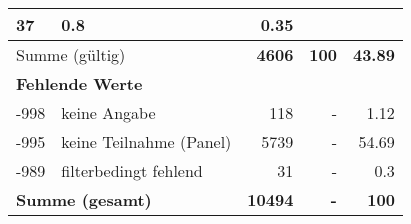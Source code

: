 \begin{longtable}{lXrrr}
       \num{37} &
       \num[round-mode=places,round-precision=2]{0,8} &
         \num[round-mode=places,round-precision=2]{0,35} \\
     \midrule
     \multicolumn{2}{l}{Summe (gültig)} &
       \textbf{\num{4606}} &
     \textbf{100} &
       \textbf{\num[round-mode=places,round-precision=2]{43,89}} \\
     \multicolumn{5}{l}{\textbf{Fehlende Werte}}\\
       -998 &
       keine Angabe &
         \num{118} &
        - &
         \num[round-mode=places,round-precision=2]{1,12} \\
       -995 &
       keine Teilnahme (Panel) &
         \num{5739} &
        - &
         \num[round-mode=places,round-precision=2]{54,69} \\
       -989 &
       filterbedingt fehlend &
         \num{31} &
        - &
         \num[round-mode=places,round-precision=2]{0,3} \\
     \midrule
     \multicolumn{2}{l}{\textbf{Summe (gesamt)}} &
          \textbf{\num{10494}} &
        \textbf{-} &
        \textbf{100} \\
     \bottomrule
     \end{longtable}
     
